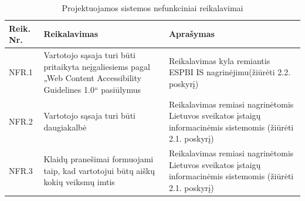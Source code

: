 \begin{table}[!ht]
    \centering
    \renewcommand{\arraystretch}{1.2}
    \renewcommand\thetable{6}
    \begin{tabular}{|m{3em}|m{17em}|m{17em}|}
    \hline 
    \rowcolor[HTML]{EFEFEF} 
    Reik. Nr. & Reikalavimas & Aprašymas \\ \hline

    NFR.1  &  Vartotojo sąsaja turi būti pritaikyta neįgaliesiems pagal „Web Content Accessibility Guidelines 1.0“ pasiūlymus  &  Reikalavimas kyla remiantis ESPBI IS nagrinėjimu(žiūrėti 2.2. poskyrį)       \\ \hline
    NFR.2  &  Vartotojo sąsaja turi būti daugiakalbė &  Reikalavimas remiasi nagrinėtomis Lietuvos sveikatos įstaigų informacinėmis sistemomis (žiūrėti 2.1. poskyrį)       \\ \hline
    NFR.3  & Klaidų pranešimai formuojami taip, kad vartotojui būtų aiškų kokių veiksmų imtis  &   Reikalavimas remiasi nagrinėtomis Lietuvos sveikatos įstaigų informacinėmis sistemomis (žiūrėti 2.1. poskyrį)       \\ \hline

    \end{tabular}
    \caption{Projektuojamos sistemos nefunkciniai reikalavimai} 

\end{table}

